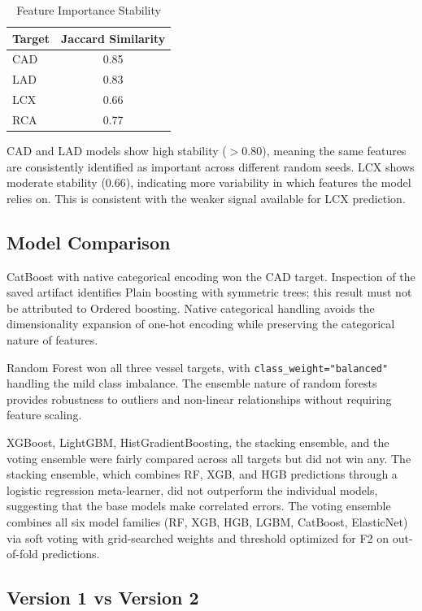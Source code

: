 \documentclass[conference]{IEEEtran}
\begin{document}
\begin{table}[htbp]
\centering
\caption{Feature Importance Stability}
\label{tab:stability}
\begin{tabular}{lc}
\toprule
\textbf{Target} & \textbf{Jaccard Similarity} \\
\midrule
CAD & 0.85 \\
LAD & 0.83 \\
LCX & 0.66 \\
RCA & 0.77 \\
\bottomrule
\end{tabular}
\end{table}

CAD and LAD models show high stability ($> 0.80$), meaning the same features are consistently identified as important across different random seeds. LCX shows moderate stability (0.66), indicating more variability in which features the model relies on. This is consistent with the weaker signal available for LCX prediction.

\subsection{Model Comparison}

CatBoost with native categorical encoding won the CAD target. Inspection of the saved artifact identifies Plain boosting with symmetric trees; this result must not be attributed to Ordered boosting. Native categorical handling avoids the dimensionality expansion of one-hot encoding while preserving the categorical nature of features.

Random Forest won all three vessel targets, with \texttt{class\_weight="balanced"} handling the mild class imbalance. The ensemble nature of random forests provides robustness to outliers and non-linear relationships without requiring feature scaling.

XGBoost, LightGBM, HistGradientBoosting, the stacking ensemble, and the voting ensemble were fairly compared across all targets but did not win any. The stacking ensemble, which combines RF, XGB, and HGB predictions through a logistic regression meta-learner, did not outperform the individual models, suggesting that the base models make correlated errors. The voting ensemble combines all six model families (RF, XGB, HGB, LGBM, CatBoost, ElasticNet) via soft voting with grid-searched weights and threshold optimized for F2 on out-of-fold predictions.

\subsection{Version 1 vs Version 2}
\end{document}
